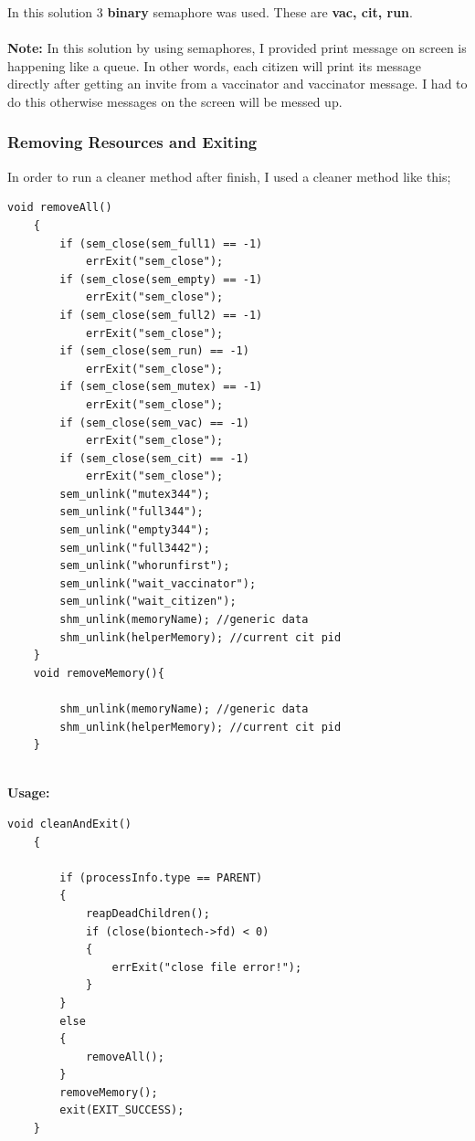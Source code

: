 \documentclass{article}
\begin{document}
In this solution 3 \textbf{binary} semaphore was used. These are \textbf{vac, cit, run}. \\ \\
\textbf{Note:} In this solution by using semaphores, I provided print message on screen
is happening like a queue. In other words, each citizen will print its message directly after getting an invite
from a vaccinator and vaccinator message. I had to do this otherwise messages on the screen will be messed up.
\subsubsection{Removing Resources and Exiting}
In order to run a cleaner method after finish, I used a cleaner method like this;
\begin{lstlisting}[style=CStyle]
    void removeAll()
    {
        if (sem_close(sem_full1) == -1)
            errExit("sem_close");
        if (sem_close(sem_empty) == -1)
            errExit("sem_close");
        if (sem_close(sem_full2) == -1)
            errExit("sem_close");
        if (sem_close(sem_run) == -1)
            errExit("sem_close");
        if (sem_close(sem_mutex) == -1)
            errExit("sem_close");
        if (sem_close(sem_vac) == -1)
            errExit("sem_close");
        if (sem_close(sem_cit) == -1)
            errExit("sem_close");
        sem_unlink("mutex344");
        sem_unlink("full344");
        sem_unlink("empty344");
        sem_unlink("full3442");
        sem_unlink("whorunfirst");
        sem_unlink("wait_vaccinator");
        sem_unlink("wait_citizen");
        shm_unlink(memoryName); //generic data
        shm_unlink(helperMemory); //current cit pid
    }
    void removeMemory(){
    
        shm_unlink(memoryName); //generic data
        shm_unlink(helperMemory); //current cit pid
    }  
    
\end{lstlisting}
\cleardoublepage
\textbf{Usage: }
\begin{lstlisting}[style=CStyle]
    void cleanAndExit()
    {
        
        if (processInfo.type == PARENT)
        {
            reapDeadChildren();
            if (close(biontech->fd) < 0)
            {
                errExit("close file error!");
            }
        }
        else
        {
            removeAll();
        }
        removeMemory();
        exit(EXIT_SUCCESS);
    }
    
\end{lstlisting}
\end{document}
